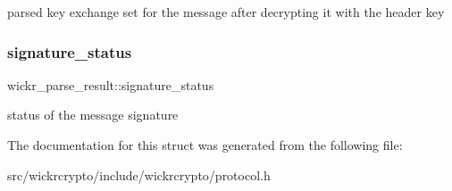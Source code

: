 parsed key exchange set for the message after decrypting it with the header key \mbox{\label{structwickr__parse__result_a989166b5471898853f03b9e9c58f69c0}} 
\subsubsection{\texorpdfstring{signature\+\_\+status}{signature\_status}}
{\footnotesize\ttfamily wickr\+\_\+parse\+\_\+result\+::signature\+\_\+status}

status of the message signature 

The documentation for this struct was generated from the following file\+:\begin{DoxyCompactItemize}
\item 
src/wickrcrypto/include/wickrcrypto/protocol.\+h\end{DoxyCompactItemize}
